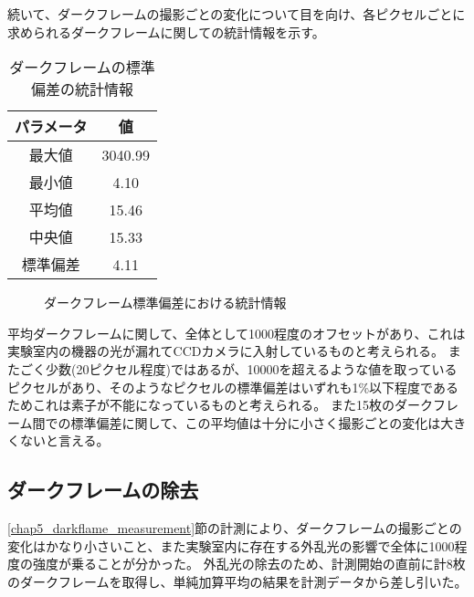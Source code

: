 続いて、ダークフレームの撮影ごとの変化について目を向け、各ピクセルごとに求められるダークフレームに関しての統計情報を示す。

\begin{table}[!ht]
\begin{center}
  \begin{tabular}{|c|c|} \hline
    パラメータ & 値 \\ \hline
    最大値 & 3040.99 \\
    最小値 & 4.10 \\
    平均値 & 15.46 \\
    中央値 & 15.33 \\
    標準偏差 & 4.11 \\ \hline
  \end{tabular}
  \caption{ダークフレームの標準偏差の統計情報}
  \label{tb:darkflame_deviation_data}
\end{center}
\end{table}

\begin{figure}[!ht]
\centering


\caption[]{ダークフレーム標準偏差における統計情報}
\label{fig:darkflame_deviation_stat}
\end{figure}

平均ダークフレームに関して、全体として1000程度のオフセットがあり、これは実験室内の機器の光が漏れてCCDカメラに入射しているものと考えられる。
またごく少数(20ピクセル程度)ではあるが、10000を超えるような値を取っているピクセルがあり、そのようなピクセルの標準偏差はいずれも1\%以下程度であるためこれは素子が不能になっているものと考えられる。
また15枚のダークフレーム間での標準偏差に関して、この平均値は十分に小さく撮影ごとの変化は大きくないと言える。

\subsection{ダークフレームの除去}
\ref{chap5_darkflame_measurement}節の計測により、ダークフレームの撮影ごとの変化はかなり小さいこと、また実験室内に存在する外乱光の影響で全体に1000程度の強度が乗ることが分かった。
外乱光の除去のため、計測開始の直前に計8枚のダークフレームを取得し、単純加算平均の結果を計測データから差し引いた。

